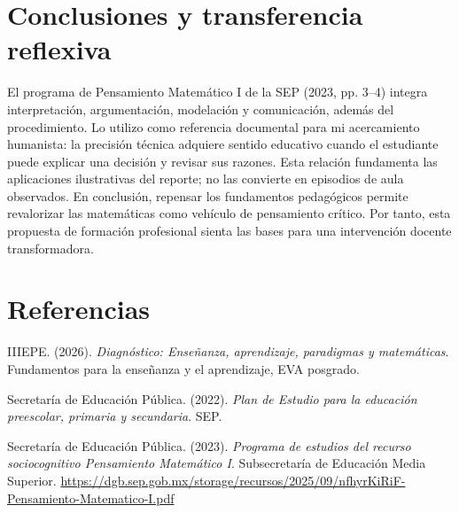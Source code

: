 \documentclass[spanish,letterpaper,oneside]{article}
\begin{document}
\section{Conclusiones y transferencia reflexiva}
El programa de Pensamiento Matemático I de la SEP (2023, pp. 3--4) integra interpretación, argumentación, modelación y comunicación, además del procedimiento. Lo utilizo como referencia documental para mi acercamiento humanista: la precisión técnica adquiere sentido educativo cuando el estudiante puede explicar una decisión y revisar sus razones. Esta relación fundamenta las aplicaciones ilustrativas del reporte; no las convierte en episodios de aula observados. En conclusión, repensar los fundamentos pedagógicos permite revalorizar las matemáticas como vehículo de pensamiento crítico. Por tanto, esta propuesta de formación profesional sienta las bases para una intervención docente transformadora.
\section*{Referencias}
{\setlength{\parskip}{6pt}
\par\hangindent=1.27cm  IIIEPE. (2026). \textit{Diagnóstico: Enseñanza, aprendizaje, paradigmas y matemáticas}. Fundamentos para la enseñanza y el aprendizaje, EVA posgrado.
\par\hangindent=1.27cm  Secretaría de Educación Pública. (2022). \textit{Plan de Estudio para la educación preescolar, primaria y secundaria}. SEP.
\par\hangindent=1.27cm Secretaría de Educación Pública. (2023). \textit{Programa de estudios del recurso sociocognitivo Pensamiento Matemático I}. Subsecretaría de Educación Media Superior. \url{https://dgb.sep.gob.mx/storage/recursos/2025/09/nfhyrKiRiF-Pensamiento-Matematico-I.pdf}
}
\end{document}
